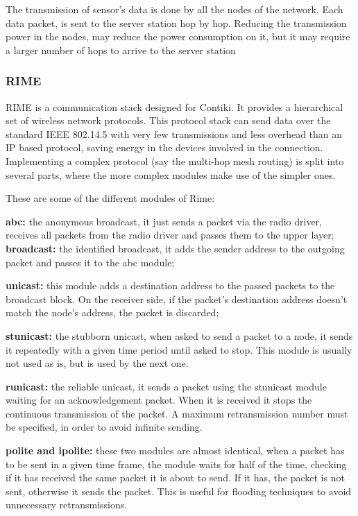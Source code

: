 The transmission of sensor's data is done by all the nodes of the network.
Each data packet,
	is sent to the server station hop by hop.
Reducing the transmission power in the nodes,
	may reduce the power consumption on it,
	but it may require a larger number of hops to arrive to the server station 

\subsubsection{RIME}

RIME is a communication stack designed for Contiki.
It provides a hierarchical set of wireless network protocols.
This protocol stack can send data over the standard IEEE 802.14.5 with very few transmissions and less overhead than an IP based protocol,
	saving energy in the devices involved in the connection.
Implementing a complex protocol (say the multi-hop mesh routing) is split into several parts,
	where the more complex modules make use of the simpler ones.


These are some of the different modules of Rime:

\textbf{abc:} the anonymous broadcast,
	it just sends a packet via the radio driver,
	receives all packets from the radio driver and passes them to the upper layer; 
\textbf{broadcast:} the identified broadcast, it adds the sender address to the outgoing
packet and passes it to the abc module;

\textbf{unicast:} this module adds a destination address to the passed packets to the broadcast block.
On the receiver side,
	if the packet's destination address doesn't match the node's address, the packet is discarded;

\textbf{stunicast:} the stubborn unicast,
	when asked to send a packet to a node,
	it sends it repeatedly with a given time period until asked to stop.
This module is usually not used as is,
	but is used by the next one.

\textbf{runicast:} the reliable unicast,
	it sends a packet using the stunicast module waiting for an acknowledgement packet.
When it is received it stops the continuous transmission of the packet.
A maximum retransmission number must be specified,
	in order to avoid infinite sending.

\textbf{polite and ipolite:} these two modules are almost identical,
	when a packet has to be sent in a given time frame,
	the module waits for half of the time,
	checking if it has received the same packet it is about to send.
If it has,
	the packet is not sent,
	otherwise it sends the packet.
This is useful for flooding techniques to avoid unnecessary retransmissions.

